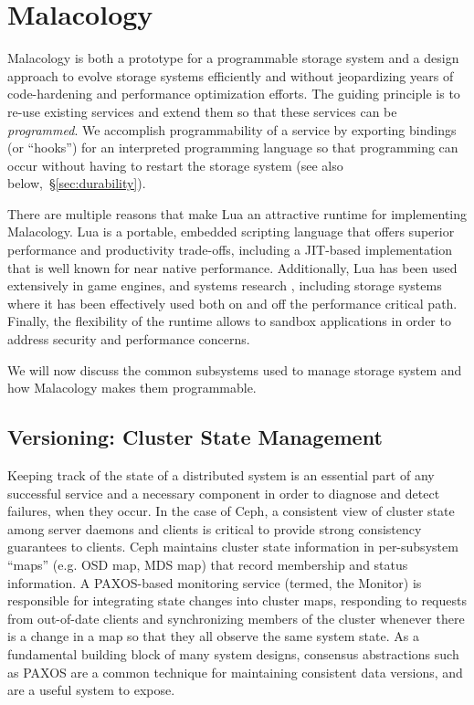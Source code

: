 \documentclass[10pt,twocolumn]{article}
\begin{document}
\section{Malacology}
\label{sec:malacology}

Malacology is both a prototype for a programmable storage system and a design
approach to evolve storage systems efficiently and without jeopardizing years
of code-hardening and performance optimization efforts. The guiding principle
is to re-use existing services and extend them so that these services can be
\emph{programmed}. We accomplish programmability of a service by exporting
bindings (or ``hooks'') for an interpreted programming language so that
programming can occur without having to restart the storage system (see also
below,~\S\ref{sec:durability}). 

There are multiple reasons that make Lua an attractive runtime for implementing
Malacology. Lua is a portable, embedded scripting language that offers superior
performance and productivity trade-offs, including a JIT-based implementation
that is well known for near native performance. Additionally, Lua has been used
extensively in game engines, and systems research \cite{neto:dls14-luaos},
including storage systems where it has been effectively used both on
\cite{grawinkel:pdsw2012-lua,watkins2013:bdmc13-in-vivo,geambasu_comet_2010}
and off \cite{sevilla:sc15-mantle} the performance critical path. Finally, the
flexibility of the runtime allows to sandbox applications in order to address
security and performance concerns.

We will now discuss the common subsystems used to manage storage system and how
Malacology makes them programmable.

\subsection{Versioning: Cluster State Management}
\label{sec:mon}
\label{consistencyversioning-of-cluster-state}

Keeping track of the state of a distributed system is an essential part of any 
successful service and a necessary component in order to diagnose and detect 
failures, when they occur. In the case of Ceph, a consistent view of cluster 
state among server daemons and clients is critical to provide strong consistency 
guarantees to clients. Ceph maintains cluster state information in per-subsystem 
``maps'' (e.g. OSD map, MDS map) that record membership and status information. 
A PAXOS-based monitoring service (termed, the Monitor) is responsible for 
integrating state changes into cluster maps, responding to requests from 
out-of-date clients and synchronizing members of the cluster whenever there is a 
change in a map so that they all observe the same system state. As a fundamental 
building block of many system designs, consensus abstractions such as PAXOS are 
a common technique for maintaining consistent data versions, and are a useful 
system to expose.
\end{document}
